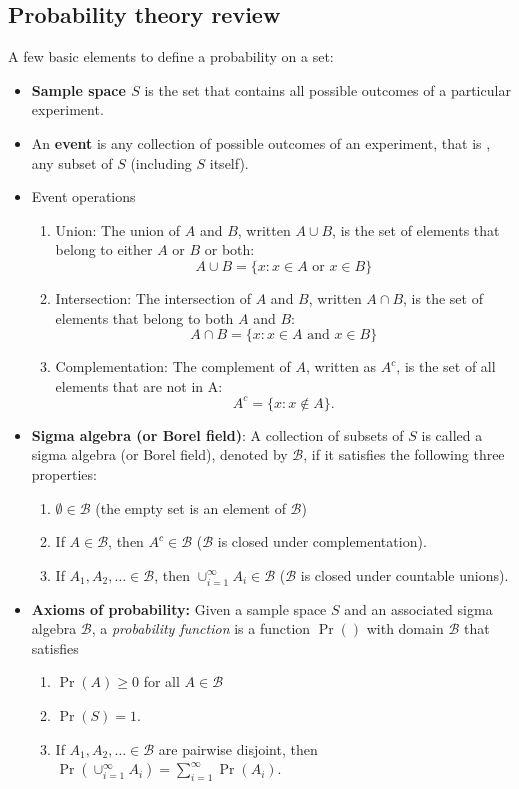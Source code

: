 \subsection*{Probability theory review}
A few basic elements to define a probability on a set:
\begin{itemize}
  \item {\bf Sample space $S$} is the set that contains all possible outcomes of a particular experiment.
  \item An {\bf event} is any collection of possible outcomes of an experiment, that is , any subset of $S$ (including $S$ itself).
  \item Event operations
    \begin{enumerate}
      \item  Union: The union of $A$ and $B$, written $A \cup B$, is the set of elements that belong to either $A$ or $B$ or both:
      $$
      A \cup B = \{x: x \in A \mbox{ or } x \in B\}
      $$
      \item Intersection:  The intersection of $A$ and $B$, written $A \cap B$, is the set of elements that belong to both $A$ and $B$:
      $$
      A \cap B = \{ x: x \in A \mbox{ and } x \in B \}
      $$
      \item Complementation:  The complement of $A$, written as $A^c$, is the set of all elements that are not in A:
      $$
      A^c = \{x: x \notin A \}.
      $$
    \end{enumerate}
  \item {\bf Sigma algebra (or Borel field)}: A collection of subsets of $S$ is called a sigma algebra (or Borel field), denoted by $\mathcal{B}$, if it satisfies the following three properties:
    \begin{enumerate}
      \item $\emptyset \in \mathcal{B}$ (the empty set is an element of $\mathcal{B}$)
      \item If $A \in \mathcal{B}$, then $A^c \in \mathcal{B}$ ($\mathcal{B}$ is closed under complementation).
      \item If $A_1, A_2, \dots \in \mathcal{B}$, then $\cup_{i = 1}^\infty A_i \in \mathcal{B}$ ($\mathcal{B}$ is closed under countable unions).
    \end{enumerate}
  
  \item {\bf Axioms of probability: } Given a sample space $S$ and an associated sigma algebra $\mathcal{B}$, a {\it probability function} is a function $\Pr()$ with domain $\mathcal{B}$ that satisfies
    \begin{enumerate}
      \item $\Pr(A) \ge 0$ for all $A \in \mathcal{B}$
      \item $\Pr(S) = 1$.
      \item If $A_1, A_2, \dots \in \mathcal{B}$ are pairwise disjoint, then $\Pr(\cup_{i = 1}^\infty A_i) = \sum_{i = 1}^\infty \Pr(A_i)$.
    \end{enumerate} 
\end{itemize}


